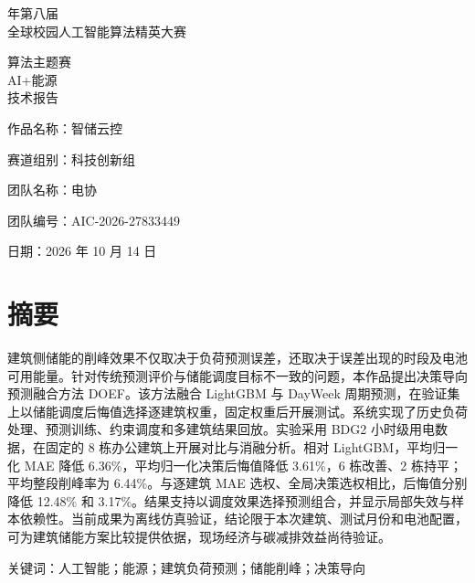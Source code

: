 \documentclass[12pt,a4paper]{article}
\begin{document}
\thispagestyle{fancy}
\vspace*{7mm}
\begin{center}
{\sffamily\fontsize{22}{30} 年第八届\\全球校园人工智能算法精英大赛\par}
\vspace{20mm}
{\sffamily\fontsize{22}{30}\selectfont 算法主题赛\\AI+能源\\技术报告\par}
\vspace{33mm}
\begin{minipage}{125mm}
\noindent 作品名称：{\sffamily\fontsize{20}{26}\selectfont 智储云控}\par\vspace{3mm}
\par\vspace{6mm}
\noindent 赛道组别：科技创新组\par\vspace{6mm}
\noindent 团队名称：电协\par\vspace{6mm}
\noindent 团队编号：AIC-2026-27833449
\end{minipage}
\vfill
{\fontsize{16}{20}\selectfont 日期：2026 年 10 月 14 日}\vspace{24mm}
\end{center}
\clearpage

\section*{摘要}
建筑侧储能的削峰效果不仅取决于负荷预测误差，还取决于误差出现的时段及电池可用能量。针对传统预测评价与储能调度目标不一致的问题，本作品提出决策导向预测融合方法 DOEF。该方法融合 LightGBM 与 DayWeek 周期预测，在验证集上以储能调度后悔值选择逐建筑权重，固定权重后开展测试。系统实现了历史负荷处理、预测训练、约束调度和多建筑结果回放。实验采用 BDG2 小时级用电数据，在固定的 8 栋办公建筑上开展对比与消融分析。相对 LightGBM，平均归一化 MAE 降低 6.36\%，平均归一化决策后悔值降低 3.61\%，6 栋改善、2 栋持平；平均整段削峰率为 6.44\%。与逐建筑 MAE 选权、全局决策选权相比，后悔值分别降低 12.48\% 和 3.17\%。结果支持以调度效果选择预测组合，并显示局部失效与样本依赖性。当前成果为离线仿真验证，结论限于本次建筑、测试月份和电池配置，可为建筑储能方案比较提供依据，现场经济与碳减排效益尚待验证。\par
关键词：人工智能；能源；建筑负荷预测；储能削峰；决策导向\par
\clearpage
\clearpage\tableofcontents\clearpage
\end{document}
